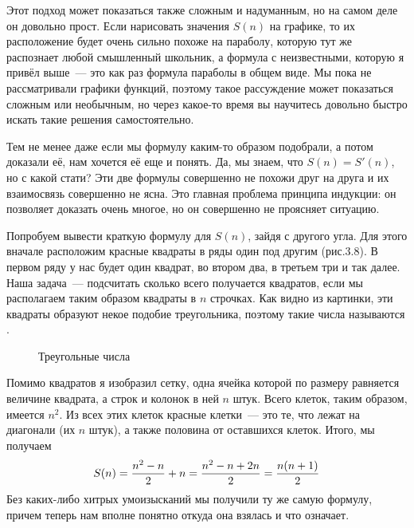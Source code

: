Этот подход может показаться также сложным и надуманным, но на самом деле он довольно прост. Если нарисовать значения $S(n)$ на графике, то их расположение будет очень сильно похоже на параболу, которую тут же распознает любой смышленный школьник, а формула с неизвестными, которую я привёл выше~— это как раз формула параболы в общем виде. Мы пока не рассматривали графики функций, поэтому такое рассуждение может показаться сложным или необычным, но через какое-то время вы научитесь довольно быстро искать такие решения самостоятельно.

Тем не менее даже если мы формулу каким-то образом подобрали, а потом доказали её, нам хочется её еще и понять. Да, мы знаем, что $S(n)=S'(n)$, но с какой стати? Эти две формулы совершенно не похожи друг на друга и их взаимосвязь совершенно не ясна. Это главная проблема принципа индукции: он позволяет доказать очень многое, но он совершенно не проясняет ситуацию.

Попробуем вывести краткую формулу для $S(n)$, зайдя с другого угла. Для этого вначале расположим красные квадраты в ряды один под другим (рис.3.8). В первом ряду у нас будет один квадрат, во втором два, в третьем три и так далее. Наша задача~— подсчитать сколько всего получается квадратов, если мы располагаем таким образом квадраты в $n$ строчках. Как видно из картинки, эти квадраты образуют некое подобие треугольника, поэтому такие числа называются .

\begin{figure}[h]
\centering
{}
\caption{Треугольные числа}
\end{figure}

Помимо квадратов я изобразил сетку, одна ячейка которой по размеру равняется величине квадрата, а строк и колонок в ней $n$ штук. Всего клеток, таким образом, имеется $n^2$. Из всех этих клеток красные клетки~— это те, что лежат на диагонали (их $n$ штук), а также половина от оставшихся клеток. Итого, мы получаем
$$S(n) = {n^2 - n\over 2} + n = {n^2 - n + 2n \over 2} = {n(n+1)\over 2}$$
Без каких-либо хитрых умоизысканий мы получили ту же самую формулу, причем теперь нам вполне понятно откуда она взялась и что означает.

